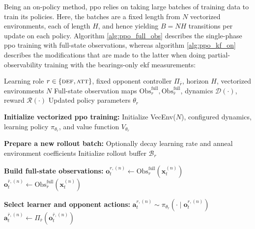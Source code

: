 Being an on-policy method, \acs{ppo} relies on taking large batches of training data to train its policies. Here, the batches are a fixed length from \(N\) vectorized environments, each of length \(H\), and hence yielding \(B=NH\) transitions per update on each policy. Algorithm \ref{alg:ppo_full_obs} describes the single-phase \acs{ppo} training with full-state observations, whereas algorithm \ref{alg:ppo_kf_on} describes the modifications that are made to the latter when doing partial-observability training with the bearings-only \acs{ekf} measurements: 


\begin{algorithm}[H]
\caption{Single-Phase \acs{ppo} Update with Full-State Observations}
\label{alg:ppo_full_obs}
\begin{algorithmic}[1]
\Require Learning role $r\in\{\textsc{def},\textsc{att}\}$, fixed opponent controller $\Pi_{\bar r}$, horizon $H$, vectorized environments $N$
\Require Full-state observation maps $\mathrm{Obs}^{\mathrm{full}}_r,\mathrm{Obs}^{\mathrm{full}}_{\bar r}$, dynamics $\mathcal{D}(\cdot)$, reward $\mathcal{R}(\cdot)$
\Ensure Updated policy parameters $\theta_r$

\State \textbf{Initialize vectorized \acs{ppo} training:}
\State \hspace{1em} Initialize VecEnv($N$), configured dynamics, learning policy $\pi_{\theta_r}$, and value function $V_{\theta_r}$

  \State \textbf{Prepare a new rollout batch:}
  \State \hspace{1em} Optionally decay learning rate and anneal environment coefficients
  \State \hspace{1em} Initialize rollout buffer $\mathcal{B}_r$

    \State \textbf{Build full-state observations:}
    \State \hspace{1em} $\mathbf{o}_t^{r,(n)} \leftarrow \mathrm{Obs}^{\mathrm{full}}_r(\mathbf{x}_t^{(n)})$
    \State \hspace{1em} $\mathbf{o}_t^{\bar r,(n)} \leftarrow \mathrm{Obs}^{\mathrm{full}}_{\bar r}(\mathbf{x}_t^{(n)})$

    \State \textbf{Select learner and opponent actions:}
    \State \hspace{1em} $\mathbf{a}_t^{r,(n)} \sim \pi_{\theta_r}(\cdot \mid \mathbf{o}_t^{r,(n)})$
    \State \hspace{1em} $\mathbf{a}_t^{\bar r,(n)} \leftarrow \Pi_{\bar r}(\mathbf{o}_t^{\bar r,(n)})$


\end{algorithmic}
\end{algorithm}
